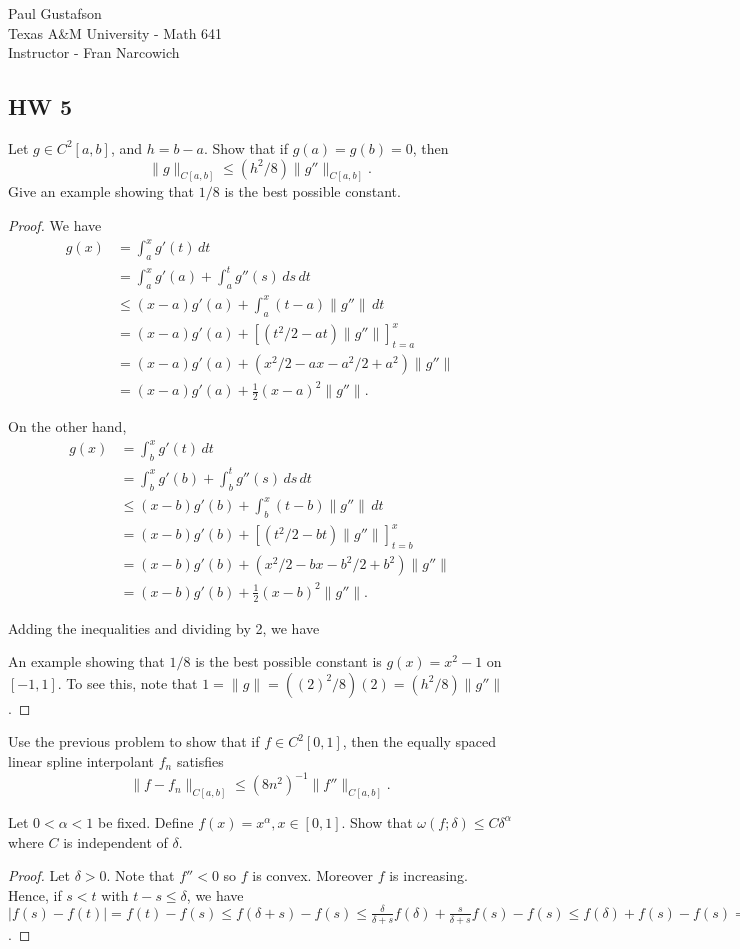 \documentclass{article}
\begin{document}
\noindent Paul Gustafson\\
\noindent Texas A\&M University - Math 641\\ 
\noindent Instructor - Fran Narcowich

\subsection*{HW 5}
 Let $g \in C^2[a,b]$, and $h = b-a$. Show that if $g(a) = g(b) = 0$, then 
$$\|g\|_{C[a,b]} \le (h^2/8) \|g''\|_{C[a,b]}.$$
Give an example showing that $1/8$ is the best possible constant.
\begin{proof}
We have
\begin{align*}
g(x)  & = \int_a^x g'(t) \, dt
\\ & = \int_a^x g'(a) + \int_a^t g''(s) \, ds \, dt
\\ & \le (x-a) g'(a) + \int_a^x (t - a) \|g''\| \,dt
\\ & = (x-a) g'(a) + \left[ (t^2/2 - at) \|g''\| \right]_{t=a}^x
\\ & = (x-a) g'(a) + (x^2/2 - ax - a^2/2 + a^2) \|g''\|
\\ & = (x-a) g'(a) + \frac 1 2 (x - a)^2 \|g''\|.
\end{align*}

On the other hand,
\begin{align*}
g(x)  & = \int_b^x g'(t) \, dt
\\ & = \int_b^x g'(b) + \int_b^t g''(s) \, ds \, dt
\\ & \le (x-b) g'(b) + \int_b^x (t - b) \|g''\| \,dt
\\ & = (x-b) g'(b) + \left[ (t^2/2 - bt) \|g''\| \right]_{t=b}^x
\\ & = (x-b) g'(b) + (x^2/2 - bx - b^2/2 + b^2) \|g''\|
\\ & = (x-b) g'(b) + \frac 1 2 (x - b)^2 \|g''\|.
\end{align*}

Adding the inequalities and dividing by 2, we have

An example showing that $1/8$ is the best possible constant is $g(x) = x^2 - 1$ on $[-1, 1]$. To see this, note that $1 = \|g\| = ((2)^2/8) (2) = (h^2/8) \|g''\|$.
\end{proof}

 Use the previous problem to show that if $f \in C^2[0,1]$, then the equally spaced linear spline interpolant $f_n$ satisfies
$$\|f - f_n \|_{C[a,b]} \le (8n^2)^{-1} \|f''\|_{C[a,b]}.$$

 Let $0 < \alpha < 1$ be fixed. Define $f(x) = x^\alpha, x \in [0,1]$. Show that $\omega(f; \delta) \le C \delta^\alpha$ where $C$ is independent of $\delta$.
\begin{proof}
Let $\delta > 0$. Note that $f'' < 0$ so $f$ is convex.  Moreover $f$ is increasing. Hence, if $s < t$ with $t - s \le \delta$, we have $|f(s) - f(t)| = f(t) - f(s) \le f(\delta + s) - f(s) \le \frac {\delta} {\delta + s} f(\delta) + \frac {s} {\delta + s} f(s) - f(s) \le f(\delta) + f(s) - f(s) = \delta^\alpha$.
\end{proof}
\end{document}
